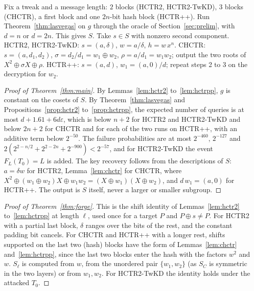 \documentclass[11pt]{article}
\theoremstyle{definition}
\theoremstyle{remark}
\newcommand{\eps}{\varepsilon}
\begin{document}
\begin{algorithm}[h]
\caption{Recovery of the hash keys}\label{alg:attack}
\begin{algorithmic}[1]
\State Fix a tweak and a message length: $2$ blocks (HCTR2, HCTR2-TwKD), $3$ blocks (CHCTR), a first block and one $2n$-bit hash block (HCTR++).
\State Run Theorem~\ref{thm:lasvegas} on $g$ through the oracle of Section~\ref{sec:prelim}, with $d=n$ or $d=2n$. This gives $S$.
\State Take $s\in S$ with nonzero second component.
\State HCTR2, HCTR2-TwKD: $s=(a,\delta)$, $w=a/\delta$, $h=w\,x^n$.
\State CHCTR: $s=(a,d_1,d_2)$, $\sigma=d_2/d_1=w_1\oplus w_2$, $\rho=a/d_1=w_1w_2$; output the two roots of $X^2\oplus\sigma X\oplus\rho$.
\State HCTR++: $s=(a,d)$, $w_1=(a,0)/d$; repeat steps 2 to 3 on the decryption for $w_2$.
\end{algorithmic}
\end{algorithm}

\begin{proof}[Proof of Theorem~\ref{thm:main}]
By Lemmas~\ref{lem:hctr2} to~\ref{lem:hctrpp}, $g$ is constant on the cosets of $S$. By Theorem~\ref{thm:lasvegas} and Propositions~\ref{prop:hctr2} to~\ref{prop:hctrpp}, the expected number of queries is at most $d+1.61+6d\eps$, which is below $n+2$ for HCTR2 and HCTR2-TwKD and below $2n+2$ for CHCTR and for each of the two runs on HCTR++, with an additive term below $2^{-50}$. The failure probabilities are at most $2^{-460}$, $2^{-127}$ and $2(2^{2-n/2}+2^{2-2n}+2^{-900})<2^{-57}$, and for HCTR2-TwKD the event $F_L(T_0)=L$ is added. The key recovery follows from the descriptions of $S$: $a=\delta w$ for HCTR2, Lemma~\ref{lem:chctr} for CHCTR, where $X^2\oplus(w_1\oplus w_2)X\oplus w_1w_2=(X\oplus w_1)(X\oplus w_2)$, and $d\,w_1=(a,0)$ for HCTR++. The output is $S$ itself, never a larger or smaller subgroup.
\end{proof}

\begin{proof}[Proof of Theorem~\ref{thm:forge}]
This is the shift identity of Lemmas~\ref{lem:hctr2} to~\ref{lem:hctrpp} at length $\ell$, used once for a target $P$ and $P\oplus s\ne P$. For HCTR2 with a partial last block, $\delta$ ranges over the bits of the rest, and the constant padding bit cancels. For CHCTR and HCTR++ with a longer rest, shifts supported on the last two (hash) blocks have the form of Lemmas~\ref{lem:chctr} and~\ref{lem:hctrpp}, since the last two blocks enter the hash with the factors $w^2$ and $w$. $S_\ell$ is computed from $w$, from the unordered pair $\{w_1,w_2\}$ (as $S_C$ is symmetric in the two layers) or from $w_1,w_2$. For HCTR2-TwKD the identity holds under the attacked $T_0$.
\end{proof}
\end{document}
